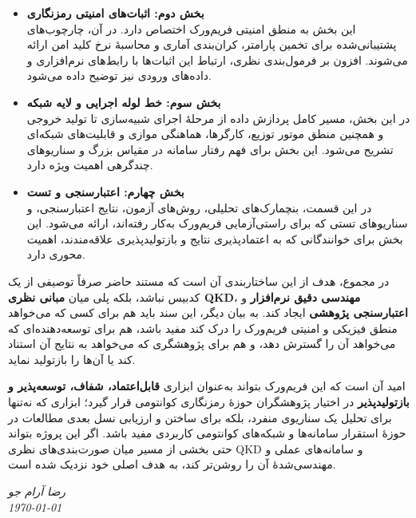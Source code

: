 \begin{sloppypar}
\begin{itemize}
	\item \textbf{بخش دوم: اثبات‌های امنیتی رمزنگاری} \\
	این بخش به منطق امنیتی فریم‌ورک اختصاص دارد. در آن، چارچوب‌های پشتیبانی‌شده برای تخمین پارامتر، کران‌بندی آماری و محاسبهٔ نرخ کلید امن ارائه می‌شوند. افزون بر فرمول‌بندی نظری، ارتباط این اثبات‌ها با رابط‌های نرم‌افزاری و داده‌های ورودی نیز توضیح داده می‌شود.
	
	\item \textbf{بخش سوم: خط لوله اجرایی و لایه شبکه} \\
	در این بخش، مسیر کامل پردازش داده از مرحلهٔ اجرای شبیه‌سازی تا تولید خروجی و همچنین منطق موتور توزیع، کارگرها، هماهنگی موازی و قابلیت‌های شبکه‌ای تشریح می‌شود. این بخش برای فهم رفتار سامانه در مقیاس بزرگ و سناریوهای چندگرهی اهمیت ویژه دارد.
	
	\item \textbf{بخش چهارم: اعتبارسنجی و تست} \\
	در این قسمت، بنچمارک‌های تحلیلی، روش‌های آزمون، نتایج اعتبارسنجی، و سناریوهای تستی که برای راستی‌آزمایی فریم‌ورک به‌کار رفته‌اند، ارائه می‌شود. این بخش برای خوانندگانی که به اعتمادپذیری نتایج و بازتولیدپذیری علاقه‌مندند، اهمیت محوری دارد.
\end{itemize}

در مجموع، هدف از این ساختاربندی آن است که مستند حاضر صرفاً توصیفی از یک کدبیس نباشد، بلکه پلی میان \textbf{مبانی نظری QKD}، \textbf{مهندسی دقیق نرم‌افزار} و \textbf{اعتبارسنجی پژوهشی} ایجاد کند. به بیان دیگر، این سند باید هم برای کسی که می‌خواهد منطق فیزیکی و امنیتی فریم‌ورک را درک کند مفید باشد، هم برای توسعه‌دهنده‌ای که می‌خواهد آن را گسترش دهد، و هم برای پژوهشگری که می‌خواهد به نتایج آن استناد کند یا آن‌ها را بازتولید نماید.

امید آن است که این فریم‌ورک بتواند به‌عنوان ابزاری \textbf{قابل‌اعتماد، شفاف، توسعه‌پذیر و بازتولیدپذیر} در اختیار پژوهشگران حوزهٔ رمزنگاری کوانتومی قرار گیرد؛ ابزاری که نه‌تنها برای تحلیل یک سناریوی منفرد، بلکه برای ساختن و ارزیابی نسل بعدی مطالعات در حوزهٔ استقرار سامانه‌ها و شبکه‌های کوانتومی کاربردی مفید باشد. اگر این پروژه بتواند حتی بخشی از مسیر میان صورت‌بندی‌های نظری QKD و سامانه‌های عملی و مهندسی‌شدهٔ آن را روشن‌تر کند، به هدف اصلی خود نزدیک شده است.
\end{sloppypar}
\vspace{2cm}
\begin{flushleft}
	\textit{رضا آرام جو}\\
	\textit{\today}
\end{flushleft}
